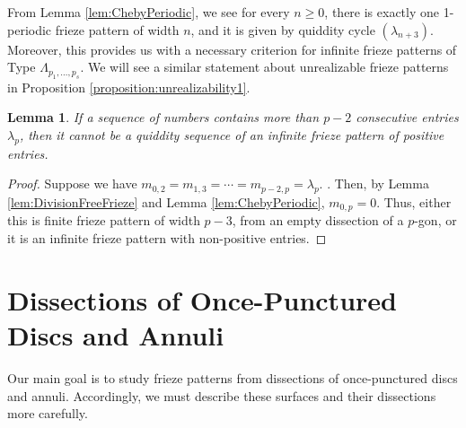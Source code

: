 \documentclass[12pt]{article}
\newtheorem{corollary}{Corollary}
\newtheorem{lemma}{Lemma}
\theoremstyle{remark}
\begin{document}
From Lemma \ref{lem:ChebyPeriodic}, we see for every $n \geq 0$, there is exactly one 1-periodic frieze pattern of width $n$, and it is given by quiddity cycle $(\lambda_{n+3})$. Moreover, this provides us with a necessary criterion for infinite frieze patterns of Type $\Lambda_{p_1,\ldots,p_s}$. We will see a similar statement about unrealizable frieze patterns in Proposition \ref{proposition:unrealizability1}. 

\begin{lemma}\label{lemma:1}
If a sequence of numbers contains more than $p-2$ consecutive entries $\lambda_p$,  then it cannot be a quiddity sequence of an infinite frieze pattern of positive entries.
\end{lemma}


\begin{proof}
Suppose we have $m_{0,2} = m_{1,3} = \cdots = m_{p -2,p} = \lambda_p$. . Then, by Lemma \ref{lem:DivisionFreeFrieze} and Lemma \ref{lem:ChebyPeriodic}, $m_{0,p} = 0$. Thus, either this is finite frieze pattern of width $p-3$, from an empty dissection of a $p$-gon, or it is an infinite frieze pattern with non-positive entries.
\end{proof}





\section{Dissections of Once-Punctured Discs and Annuli}\label{sec:Dissections}

Our main goal is to study frieze patterns from dissections of once-punctured discs and annuli. Accordingly, we must describe these surfaces and their dissections more carefully. 
\end{document}
